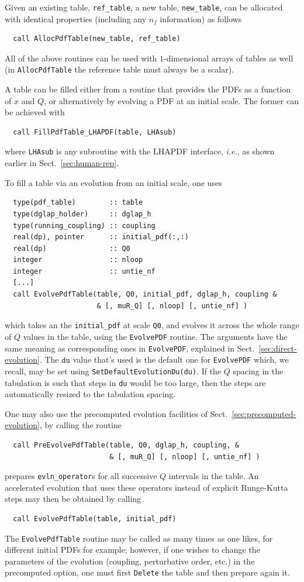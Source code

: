 \documentclass[12pt]{article}
\newcommand{\ttt}[1]{\texttt{#1}}
\begin{document}
Given an existing table, \ttt{ref\_table}, a new table,
\ttt{new\_table}, can be allocated with identical properties
(including any $n_f$ information) as follows
\begin{lstlisting}
  call AllocPdfTable(new_table, ref_table)
\end{lstlisting}
All of the above routines can be used with $1$-dimensional arrays of
tables as well (in \ttt{AllocPdfTable} the reference table must always
be a scalar).

A table can be filled either from a routine that provides the PDFs as
a function of $x$ and $Q$, or alternatively by evolving a PDF at an
initial scale. The former can be achieved with
\begin{lstlisting}
  call FillPdfTable_LHAPDF(table, LHAsub)
\end{lstlisting}
where \ttt{LHAsub} is any subroutine with the LHAPDF interface,
{\it i.e.}, as shown earlier
in Sect.~\ref{sec:human-rep}.

To fill a table via an evolution from an initial scale, one uses 
\begin{lstlisting}
  type(pdf_table)        :: table
  type(dglap_holder)     :: dglap_h
  type(running_coupling) :: coupling
  real(dp), pointer      :: initial_pdf(:,:)
  real(dp)               :: Q0
  integer                :: nloop
  integer                :: untie_nf
  [...]
  call EvolvePdfTable(table, Q0, initial_pdf, dglap_h, coupling &
                      & [, muR_Q] [, nloop] [, untie_nf] )
\end{lstlisting}
which takes an the \ttt{initial\_pdf} at scale \ttt{Q0}, and evolves
it across the whole range of $Q$ values in the table, using the
\ttt{EvolvePDF} routine. The arguments have the same meaning as
corresponding ones in \ttt{EvolvePDF}, explained in
Sect.~\ref{sec:direct-evolution}. The $\ttt{du}$ value that's used
is the default one for \ttt{EvolvePDF} which, we recall, may be set
using \ttt{SetDefaultEvolutionDu(du)}. If the $Q$ spacing in the
tabulation is such that steps in \ttt{du} would be too large, then the
steps are automatically resized to the tabulation spacing.

One may also use the precomputed evolution facilities of
Sect.~\ref{sec:precomputed-evolution}, by calling the routine
\begin{lstlisting}
  call PreEvolvePdfTable(table, Q0, dglap_h, coupling, &
                         & [, muR_Q] [, nloop] [, untie_nf] )
\end{lstlisting}
prepares \ttt{evln\_operator}s for all successive $Q$ intervals in the
table. An accelerated evolution that uses these operators instead of
explicit Runge-Kutta steps may then be obtained by calling
\begin{lstlisting}
  call EvolvePdfTable(table, initial_pdf)
\end{lstlisting}
The \ttt{EvolvePdfTable} routine may be called as many times as one
likes, for different initial PDFs for example;
however, if one wishes to change the parameters of
the evolution (coupling, perturbative order, etc.) 
in the precomputed option, one must
first \ttt{Delete} the table and then prepare again it.
\end{document}
